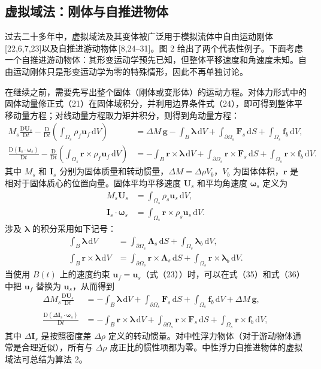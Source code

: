 \documentclass[UTF8,11pt,a4paper]{ctexart}
\newcommand{\dd}{\,\mathrm{d}}
\newcommand{\D}{\mathrm{D}}
\begin{document}
\subsection{虚拟域法：刚体与自推进物体}

过去二十多年中，虚拟域法及其变体被广泛用于模拟流体中自由运动刚体\,[22,6,7,23]以及自推进游动物体\,[8,24--31]。图 2 给出了两个代表性例子。下面考虑一个自推进游动物体：其形变运动学预先已知，但整体平移速度和角速度未知。自由运动刚体只是形变运动学为零的特殊情形，因此不再单独讨论。

在继续之前，需要先写出整个固体（刚体或变形体）的运动方程。对体力形式中的固体动量修正式（21）在固体域积分，并利用边界条件式（24），即可得到整体平移动量方程；对线动量方程取力矩并积分，则得到角动量方程：
\begin{align}
M_s\frac{\D\bm U_s}{\D t}
-\frac{\D}{\D t}\left(\int_{\Omega_s}\rho_f\bm u_f\dd V\right)
&=\Delta M\,\bm g-\int_B\bm\lambda\dd V
+\int_{\partial\Omega_s}\bm F_s\dd S+\int_{\Omega_s}\bm f_b\dd V, \tag{35}\\
\frac{\D(\bm I_s\cdot\bm\omega_s)}{\D t}
-\frac{\D}{\D t}\left(\int_{\Omega_s}\bm r\times\rho_f\bm u_f\dd V\right)
&=-\int_B\bm r\times\bm\lambda\dd V
+\int_{\partial\Omega_s}\bm r\times\bm F_s\dd S
+\int_{\Omega_s}\bm r\times\bm f_b\dd V. \tag{36}
\end{align}
其中 $M_s$ 和 $\bm I_s$ 分别为固体质量和转动惯量，$\Delta M=\Delta\rho V_b$，$V_b$ 为固体体积，$\bm r$ 是相对于固体质心的位置向量。固体平均平移速度 $\bm U_s$ 和平均角速度 $\bm\omega_s$ 定义为
\begin{align}
M_s\bm U_s&=\int_{\Omega_s}\rho_s\bm u_s\dd V, \tag{37}\\
\bm I_s\cdot\bm\omega_s&=\int_{\Omega_s}\bm r\times\rho_s\bm u_s\dd V. \tag{38}
\end{align}
涉及 $\bm\lambda$ 的积分采用如下记号：
\begin{align}
\int_B\bm\lambda\dd V
&=\int_{\partial\Omega_s}\bm\Lambda_s\dd S+\int_{\Omega_s}\bm\lambda_b\dd V, \tag{39}\\
\int_B\bm r\times\bm\lambda\dd V
&=\int_{\partial\Omega_s}\bm r\times\bm\Lambda_s\dd S+\int_{\Omega_s}\bm r\times\bm\lambda_b\dd V. \tag{40}
\end{align}
当使用 $B(t)$ 上的速度约束 $\bm u_f=\bm u_s$（式（23））时，可以在式（35）和式（36）中把 $\bm u_f$ 替换为 $\bm u_s$，从而得到
\begin{align}
\Delta M_s\frac{\D\bm U_s}{\D t}
&=-\int_B\bm\lambda\dd V+\int_{\partial\Omega_s}\bm F_s\dd S
+\int_{\Omega_s}\bm f_b\dd V+\Delta M\,\bm g, \tag{41}\\
\frac{\D(\Delta\bm I_s\cdot\bm\omega_s)}{\D t}
&=-\int_B\bm r\times\bm\lambda\dd V
+\int_{\partial\Omega_s}\bm r\times\bm F_s\dd S
+\int_{\Omega_s}\bm r\times\bm f_b\dd V, \tag{42}
\end{align}
其中 $\Delta\bm I_s$ 是按照密度差 $\Delta\rho$ 定义的转动惯量。对中性浮力物体（对于游动物体通常是合理近似），所有与 $\Delta\rho$ 成正比的惯性项都为零。中性浮力自推进物体的虚拟域法可总结为算法 2。
\end{document}

